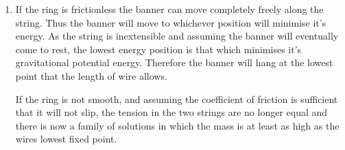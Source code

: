 \begin{problem}
{\begin{enumerate}
	  Resolving forces vertically $W + T\sin\alpha - T\sin\alpha = 0$, as now one of the tension forces must act with a downwards component. This simply leaves $W = 0$ which is clearly not true and highlights a physical impossibility. The banner can never be at a higher elevation than the lowest point the wire is fixed at. Previously this problem wasn't encountered as the position of the banner assymptoted to $x = 0$ as $h$ was increased (or $\lambda$ decreased).
	  
	 Thus the banner cannot hang above the level of the building, but what about at the same height. In this case the angle $\alpha$ would have to be 0, hence the wire horizontal. This would mean there was no vertical component of force on the banner from the wires and therefore nothing to support it's weight.
	  
	    \item If the ring is frictionless the banner can move completely freely along the string. Thus the banner will move to whichever position will minimise it's energy. As the string is inextensible and assuming the banner will eventually come to rest, the lowest energy position is that which minimises it's gravitational potential energy. Therefore the banner will hang at the lowest point that the length of wire allows.
	    
	    If the ring is not smooth, and assuming the coefficient of friction is sufficient that it will not slip, the tension in the two strings are no longer equal and there is now a family of solutions in which the mass is at least as high as the wires lowest fixed point.

\end{enumerate}
}
\end{problem}